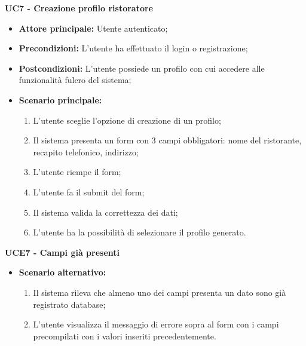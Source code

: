 \textbf{UC7 - Creazione profilo ristoratore}
\begin{itemize}
    \item \textbf{Attore principale: }Utente autenticato;
    \item \textbf{Precondizioni: }L'utente ha effettuato il login o registrazione;
    \item \textbf{Postcondizioni: }L'utente possiede un profilo con cui accedere alle funzionalità fulcro del sistema;
    \item \textbf{Scenario principale:}
        \begin{enumerate}
            \item L'utente sceglie l'opzione di creazione di un profilo;
            \item Il sistema presenta un form con 3 campi obbligatori: nome del ristorante, recapito telefonico, indirizzo;
            \item L'utente riempe il form;
            \item L'utente fa il submit del form;
            \item Il sistema valida la correttezza dei dati;
            \item L'utente ha la possibilità di selezionare il profilo generato.
        \end{enumerate}
\end{itemize}

\textbf{UCE7 - Campi già presenti}
\begin{itemize}
    \item \textbf{Scenario alternativo:}
        \begin{enumerate}
            \item Il sistema rileva che almeno uno dei campi presenta un dato sono già registrato database;
            \item L'utente visualizza il messaggio di errore sopra al form con i campi precompilati con i valori
              inseriti precedentemente.
        \end{enumerate}
\end{itemize}
